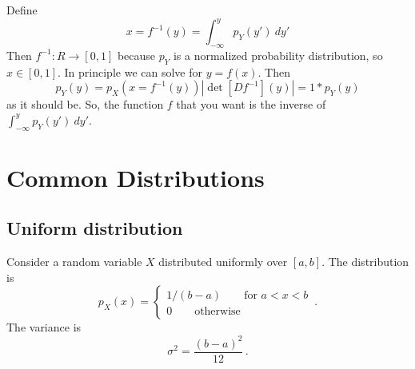 \documentclass{article}
\begin{document}
Define
\begin{equation}
x=f^{-1}(y)=\int_{-\infty}^{y}p_{Y}(y')~dy'
\end{equation}
 Then $f^{-1}:R\rightarrow[0,1]$ because $p_{Y}$ is a normalized
probability distribution, so $x\in[0,1]$. In principle we can solve
for $y=f(x)$. Then
\begin{equation}
p_{Y}(y)=p_{X}(x=f^{-1}(y))|\det[Df^{-1}](y)|=1*p_{Y}(y)
\end{equation}
as it should be. So, the function $f$ that you want is the inverse
of $\int_{-\infty}^{y}p_{Y}(y')~dy'$.


\section{Common Distributions}

\subsection{Uniform distribution}

Consider a random variable $X$ distributed uniformly over $[a,b]$.
The distribution is
\begin{equation}
p_{X}(x)=\left\{ \begin{array}{c}
1/(b-a)\qquad\textrm{for }a<x<b\\
0\qquad\textrm{otherwise}\end{array}\right. \, .
\end{equation}
The variance is
\begin{equation}
\sigma^{2}=\frac{(b-a)^2}{12} \, .
\end{equation}
\end{document}
